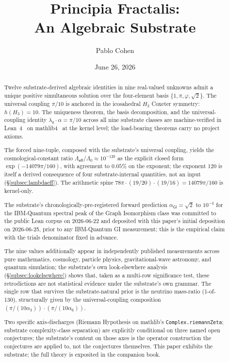 \documentclass[11pt,a4paper]{amsart}
\title{Principia Fractalis:\\ An Algebraic Substrate}
\author{Pablo Cohen}
\date{June 26, 2026}
\theoremstyle{plain}
\theoremstyle{definition}
\begin{document}
\maketitle

\begin{abstract}
Twelve substrate-derived algebraic identities in nine real-valued unknowns admit a unique positive simultaneous solution over the four-element basis $\{1,\pi,\varphi,\sqrt{2}\}$. The universal coupling $\pi/10$ is anchored in the icosahedral $H_3$ Coxeter symmetry: $h(H_3) = 10$. The uniqueness theorem, the basis decomposition, and the universal-coupling identity $\lambda_0 \cdot \alpha = \pi/10$ across all nine substrate classes are machine-verified in Lean~4~\cite{moura-ullrich2021} on mathlib4~\cite{mathlib4} at the kernel level; the load-bearing theorems carry no project axioms.

The forced nine-tuple, composed with the substrate's universal coupling, yields the cosmological-constant ratio $\Lambda_{\textsf{eff}}/\Lambda_0 \approx 10^{-120}$ as the explicit closed form $\exp(-14079\pi/160)$, with agreement to $0.05\%$ on the exponent; the exponent $120$ is itself a derived consequence of four substrate-internal quantities, not an input (\S\ref{subsec:lambdaeff}). The arithmetic spine $78\pi \cdot (19/20) \cdot (19/16) = 14079\pi/160$ is kernel-only.

The substrate's chronologically-pre-registered forward prediction $\alpha_{\textsf{GI}} = \sqrt{2}$ to $10^{-4}$ for the IBM-Quantum spectral peak of the Graph Isomorphism class was committed to the public Lean corpus on 2026-06-22 and deposited with this paper's initial deposition on 2026-06-25, prior to any IBM-Quantum GI measurement; this is the empirical claim with the trials denominator fixed in advance.

The nine values additionally appear in independently published measurements across pure mathematics, cosmology, particle physics, gravitational-wave astronomy, and quantum simulation; the substrate's own look-elsewhere analysis (\S\ref{subsec:lookelsewhere}) shows that, taken as a multi-row significance test, these retrodictions are not statistical evidence under the substrate's own grammar. The single row that survives the substrate-natural prior is the neutrino mass-ratio (1-of-130), structurally given by the universal-coupling composition $(\pi/(10\alpha_3))\cdot(\pi/(10\alpha_6))$.

Two specific axis-discharges (Riemann Hypothesis on mathlib's \texttt{Complex.riemannZeta}; substrate complexity-class separation) are explicitly conditional on three named open conjectures; the substrate's content on those axes is the operator construction the conjectures are applied to, not the conjectures themselves. This paper exhibits the substrate; the full theory is exposited in the companion book.
\end{abstract}
\end{document}
